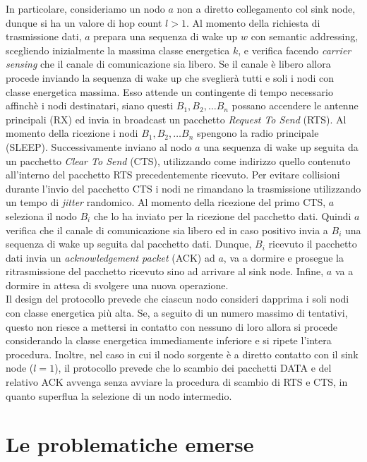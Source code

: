 \documentclass{report}
\begin{document}
In particolare,
consideriamo un nodo $a$ non a diretto collegamento col sink node, dunque si ha un valore di hop count $l>1$. Al momento della richiesta di trasmissione dati,
$a$ prepara una sequenza di wake up $w$ con semantic addressing, scegliendo inizialmente la massima classe energetica $k$, e verifica facendo
\emph{carrier sensing} che il canale di comunicazione sia libero. Se il canale è libero allora procede inviando la sequenza di wake up che sveglierà tutti
e soli i nodi con classe energetica massima. Esso attende un contingente di tempo necessario affinchè i nodi destinatari, siano questi $B_1, B_2, \ldots B_n$ 
possano accendere le antenne principali (RX) ed invia in broadcast un pacchetto \emph{Request To Send} (RTS). Al momento della ricezione 
i nodi $B_1, B_2, \ldots B_n$ spengono la radio principale (SLEEP). Successivamente inviano al nodo $a$ una sequenza di wake up seguita da un pacchetto
\emph{Clear To Send} (CTS), utilizzando come indirizzo quello contenuto all'interno del pacchetto RTS precedentemente ricevuto. Per evitare collisioni
durante l'invio del pacchetto CTS i nodi ne rimandano la trasmissione utilizzando un tempo di \emph{jitter} randomico.
Al momento della ricezione del primo CTS, $a$ seleziona il nodo $B_i$ che lo ha inviato per la ricezione del pacchetto dati.
Quindi $a$ verifica che il canale di comunicazione sia libero ed in caso positivo invia a $B_i$ una sequenza di wake up
seguita dal pacchetto dati. Dunque, $B_i$ ricevuto il pacchetto dati invia un \emph{acknowledgement packet} (ACK) ad $a$, va a dormire e prosegue la
ritrasmissione del pacchetto ricevuto sino ad arrivare al sink node. Infine, $a$ va a dormire in attesa di svolgere una nuova operazione.\\

Il design del protocollo prevede che ciascun nodo consideri dapprima i soli nodi con classe energetica più alta. Se, a seguito di un numero massimo di tentativi,
questo non riesce a mettersi in contatto con nessuno di loro allora si procede considerando la classe energetica immediamente inferiore e si ripete
l'intera procedura. Inoltre, nel caso in cui il nodo sorgente è a diretto contatto con il sink node ($l=1$), il protocollo prevede che
lo scambio dei pacchetti DATA e del relativo ACK avvenga senza avviare la procedura di scambio di RTS e CTS, in quanto superflua la
selezione di un nodo intermedio.\\

\section{Le problematiche emerse}
\end{document}
